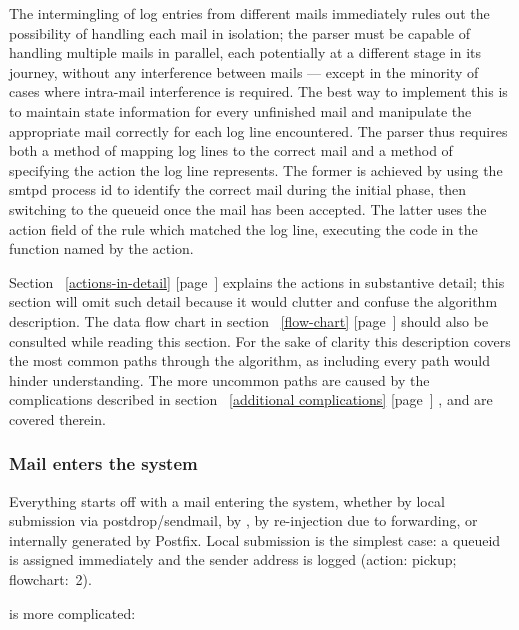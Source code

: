 \documentclass[a4paper,12pt,draft]{article}
\newcommand{\refwithpage}[1]{%
    \empty{}\ref{#1} [page~\pageref{#1}]%
}
\begin{document}
\label{full-algorithm}

The intermingling of log entries from different mails immediately rules out
the possibility of handling each mail in isolation; the parser must be
capable of handling multiple mails in parallel, each potentially at a
different stage in its journey, without any interference between mails ---
except in the minority of cases where intra-mail interference is required.
The best way to implement this is to maintain state information for every
unfinished mail and manipulate the appropriate mail correctly for each log
line encountered.  The parser thus requires both a method of mapping log
lines to the correct mail and a method of specifying the action the log
line represents.  The former is achieved by using the smtpd process id to
identify the correct mail during the initial phase, then switching to the
queueid once the mail has been accepted.  The latter uses the action field
of the rule which matched the log line, executing the code in the function
named by the action.

Section~\refwithpage{actions-in-detail} explains the actions in substantive
detail; this section will omit such detail because it would clutter and
confuse the algorithm description.  The data flow chart in
section~\refwithpage{flow-chart} should also be consulted while reading
this section.  For the sake of clarity this description covers the most
common paths through the algorithm, as including every path would hinder
understanding.  The more uncommon paths are caused by the complications
described in section~\refwithpage{additional complications}, and are
covered therein.

\subsubsection{Mail enters the system}

\label{mail-enters-the-system}

Everything starts off with a mail entering the system, whether by local
submission via postdrop/sendmail, by \SMTP{}, by re-injection due to
forwarding, or internally generated by Postfix.  Local submission is the
simplest case: a queueid is assigned immediately and the sender address is
logged (action: pickup; flowchart:~2).

\SMTP{} is more complicated: 
\end{document}
